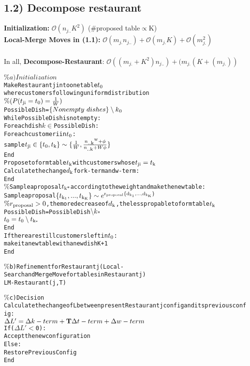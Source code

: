 \documentclass{article}
\begin{document}
\begin{spacing}{1.1}
\subsection{1.2) Decompose restaurant}
{\bf Initialization:} $\mathcal{O}(n_{j..}K^{2})$ ($\#$proposed table$\propto$K)\\
{\bf Local-Merge Moves in (1.1):} $\mathcal{O}(m_{j.}n_{j..})+\mathcal{O}(m_{j.}K)+\mathcal{O}(m_{j.}^2)$\\ \\
In all, {\bf Decompose-Restaurant}: $\mathcal{O}((m_{j.}+K^{2})n_{j..})+(m_{j.}(K+(m_{j.}))$
\begin{alltt}
\(\%a) Initialization\)
Make Restaurant j into one table \(t\textsubscript{0}\) where customers following uniform distribution
\(\%(P(t\textsubscript{ji}=t\textsubscript{0})=\frac{1}{W})\)      
Possible Dish=\(\{Nonempty \ dishes\}\setminus k\textsubscript{0}\)      
While Possible Dish is not empty:      
      For each dish \(k\in\)Possible Dish:          
          For each customer i in \(t\textsubscript{0}\):
              sample \(t\textsubscript{ji}\in\{t\textsubscript{0},t\textsubscript{k}\}\sim\{\frac{1}{W},\frac{n\textsubscript{..k}\textsuperscript{w}+\phi}{n\textsubscript{..k}+W\phi}\}\)                
          End
      Propose to form table \(t\textsubscript{k}\) with customers whose \(t\textsubscript{ji}=t\textsubscript{k}\)
      Calculate the change \(d\textsubscript{k}\) for k-term and w-term:
      End
      \(\%\)Sample a proposal \(t\textsubscript{k*}\) according to the weight and make the new table:
      Sample a proposal \(\{t\textsubscript{k\textsubscript{1}},...,t\textsubscript{k\textsubscript{K}}\}\sim e\textsuperscript{r\textsubscript{proposal}\{d\textsubscript{k\textsubscript{1}},...,d\textsubscript{k\textsubscript{K}}\}}\)
      \(\%r\textsubscript{proposal}>0\), the more decrease of \(d\textsubscript{k}\), the less propable to form table \(t\textsubscript{k}\)
      Possible Dish=Possible Dish\(\setminus k\textsubscript{*}\)
      \(t\textsubscript{0}=t\textsubscript{0} \setminus t\textsubscript{k\textsubscript{*}}\)
End
If there are still customers left in \(t\textsubscript{0}\):
   make it a new table with a new dish K+1
End

\(\%\)b)Refinement for Restaurant j(Local-Search and Merge Move for tables in Restaurant j)
LM-Restaurant(j,T)

\(\%\)c)Decision
Calculate the change of L between present Restaurant j config and its previous config: 
\(\Delta L'=\Delta k-term+{\bf T}\Delta t-term+\Delta w-term\)
If(\(\Delta L'<\)0):
    Accept the new configuration
Else:
    Restore Previous Config
End    
\end{alltt}


\end{spacing}
\end{document}
